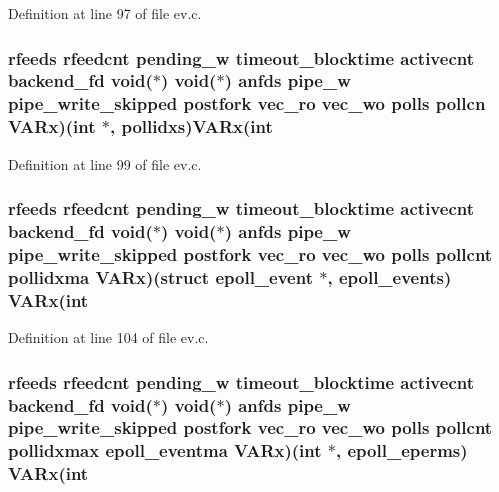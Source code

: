 \-Definition at line 97 of file ev.\-c.

\hypertarget{structev__loop_a424e9709e455906e09bf1bb9c531e77c}{
\subsubsection[{\-V\-A\-Rx}]{ {\bf rfeeds} {\bf rfeedcnt} {\bf pending\-\_\-w} {\bf timeout\-\_\-blocktime} {\bf activecnt} {\bf backend\-\_\-fd} void($\ast$) void($\ast$) {\bf anfds} {\bf pipe\-\_\-w} {\bf pipe\-\_\-write\-\_\-skipped} {\bf postfork} {\bf vec\-\_\-ro} {\bf vec\-\_\-wo} {\bf polls} pollcn {\bf \-V\-A\-Rx})(int $\ast$, {\bf pollidxs}){\bf \-V\-A\-Rx}(int}}\label{structev__loop_a424e9709e455906e09bf1bb9c531e77c}


\-Definition at line 99 of file ev.\-c.

\hypertarget{structev__loop_ad3d31f685363d42d641957e2281cb623}{
\subsubsection[{\-V\-A\-Rx}]{ {\bf rfeeds} {\bf rfeedcnt} {\bf pending\-\_\-w} {\bf timeout\-\_\-blocktime} {\bf activecnt} {\bf backend\-\_\-fd} void($\ast$) void($\ast$) {\bf anfds} {\bf pipe\-\_\-w} {\bf pipe\-\_\-write\-\_\-skipped} {\bf postfork} {\bf vec\-\_\-ro} {\bf vec\-\_\-wo} {\bf polls} {\bf pollcnt} pollidxma {\bf \-V\-A\-Rx})(struct epoll\-\_\-event $\ast$, {\bf epoll\-\_\-events}) {\bf \-V\-A\-Rx}(int}}\label{structev__loop_ad3d31f685363d42d641957e2281cb623}


\-Definition at line 104 of file ev.\-c.

\hypertarget{structev__loop_a0949624fea57acded29e6428f687f6b6}{
\subsubsection[{\-V\-A\-Rx}]{ {\bf rfeeds} {\bf rfeedcnt} {\bf pending\-\_\-w} {\bf timeout\-\_\-blocktime} {\bf activecnt} {\bf backend\-\_\-fd} void($\ast$) void($\ast$) {\bf anfds} {\bf pipe\-\_\-w} {\bf pipe\-\_\-write\-\_\-skipped} {\bf postfork} {\bf vec\-\_\-ro} {\bf vec\-\_\-wo} {\bf polls} {\bf pollcnt} {\bf pollidxmax} epoll\-\_\-eventma {\bf \-V\-A\-Rx})(int $\ast$, {\bf epoll\-\_\-eperms}) {\bf \-V\-A\-Rx}(int}}\label{structev__loop_a0949624fea57acded29e6428f687f6b6}


